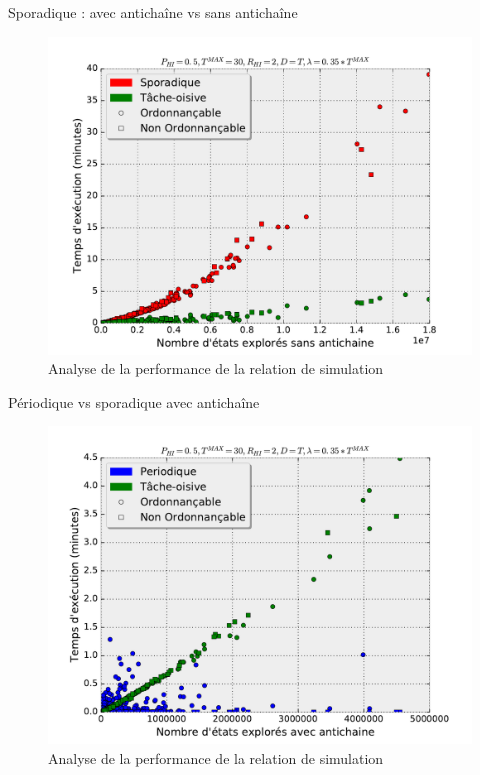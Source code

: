 \documentclass{bredelebeamer}
\begin{document}
\begin{frame}{Sporadique : avec antichaîne vs sans antichaîne}

\begin{figure}[h]
\includegraphics[width=\textwidth,height=0.8\textheight,keepaspectratio]{./results/timeSpoIdle.pdf}
\caption{Analyse de la performance de la relation de simulation}
\label{res:spoIdle}

\end{figure}

\end{frame}


\begin{frame}{Périodique vs sporadique avec antichaîne}

\begin{figure}[h]
\includegraphics[width=\textwidth,height=0.8\textheight,keepaspectratio]{./results/timePerIdle.pdf}
\caption{Analyse de la performance de la relation de simulation}
\label{res:per-idle}
\end{figure}

\end{frame}
\end{document}
